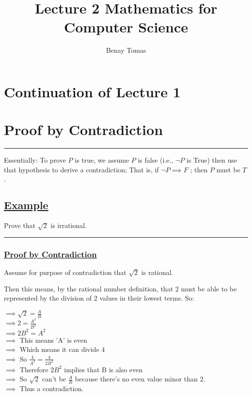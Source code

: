 \documentclass{article}
\title{Lecture 2 Mathematics for Computer Science}
\author{Benay Tomas}
\begin{document}
\selectfont

\maketitle

\thispagestyle{empty}

\section*{Continuation of Lecture 1}

\section{Proof by Contradiction}
\hrule
\vspace{0.2cm}
Essentially:
To prove $P$ is true, we assume $P$ is false
(i.e., $\neg P$ is True) then use that 
hypothesis to derive a contradiction;
That is, if $\neg P \implies F$ ; then
$P$ must be $T$.

\subsection*{\underline{Example}}

Prove that $\sqrt{2}$ is irrational.
\vspace{0.2cm}
\hrule
\subsubsection*{\underline{Proof by Contradiction}}

Assume for purpose of contradiction
that $\sqrt{2}$ is rational.

Then this means, by the rational number
definition, that 2 must be able to
be represented by the division of 2
values in their lowest terms. So:

\begin{center}
  $\implies \sqrt{2} = \frac{A}{B}$ \\
  \vspace{0.2cm}
  $\implies 2 = \frac{A^{2}}{B^{2}}$ \\
  \vspace{0.2cm}
  $\implies 2B^{2} = A^{2}$ \\
  \vspace{0.2cm}
  $\implies$ This means 'A' is even \\
  \vspace{0.2cm}
  $\implies$ Which means it can divide 4\\
  \vspace{0.2cm}
  $\implies$ So $\frac{4}{A^{2}} = \frac{4}{2B^{2}}$ \\
  \vspace{0.2cm}
  $\implies$ Therefore $2B^{2}$ implies that B is also even \\
  \vspace{0.2cm}
  $\implies$ So $\sqrt{2}$ can't be $\frac{A}{B}$ because there's no
  even value minor than $2$. \\
  \vspace{0.2cm}
  $\implies$ Thus a contradiction.
\end{center}
\end{document}
